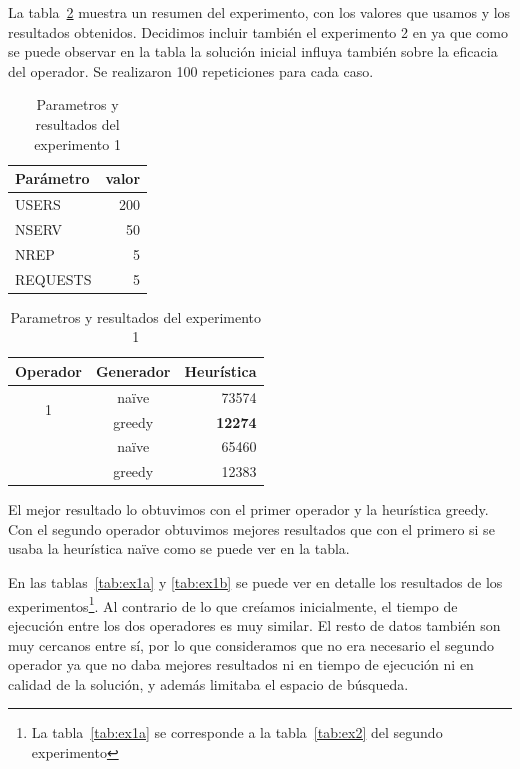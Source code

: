 \begin{hyp*}

\end{hyp*}

La tabla~\ref{tab:ex1} muestra un resumen del experimento, con los valores que usamos y los resultados obtenidos.
Decidimos incluir también el experimento 2 en ya que como se puede observar en la tabla la solución inicial
influya también sobre la eficacia del operador. Se realizaron 100 repeticiones para cada caso.

\begin{table}[H]
    \caption{Parametros y resultados del experimento 1}%
    \label{tab:ex1}
    \begin{center}
    \begin{tabular}{lr}
    \toprule
    Parámetro & valor \\
    \midrule
    USERS & 200 \\
    NSERV & 50 \\
    NREP & 5 \\
    REQUESTS & 5\\
    \bottomrule
    \end{tabular}
    \hspace{2em}
    \begin{tabular}{ccr}
    \toprule
    Operador & Generador & Heurística \\
    \midrule
    \multirow{2}{*}{1} & naïve &  73574\\
    {} & greedy & \textbf{12274} \\
    \addlinespace[0.5em]
    \multirow{2}{*}{2} & naïve &  65460\\
    {} & greedy & 12383 \\
    \bottomrule
    \end{tabular}
    \end{center}
\end{table}
\vspace{-1em}

El mejor resultado lo obtuvimos con el primer operador y la heurística greedy. Con el segundo operador
obtuvimos mejores resultados que con el primero si se usaba la heurística naïve como se puede ver en la
tabla.

En las tablas~\ref{tab:ex1a} y \ref{tab:ex1b} se puede ver en detalle los resultados de los experimentos\footnote{La tabla~\ref{tab:ex1a} se corresponde a la tabla~\ref{tab:ex2} del segundo experimento}. Al contrario
de lo que creíamos inicialmente, el tiempo de ejecución entre los dos operadores es muy similar. El resto
de datos también son muy cercanos entre sí, por lo que consideramos que no era necesario el segundo operador
ya que no daba mejores resultados ni en tiempo de ejecución ni en calidad de la solución, y además limitaba
el espacio de búsqueda.

